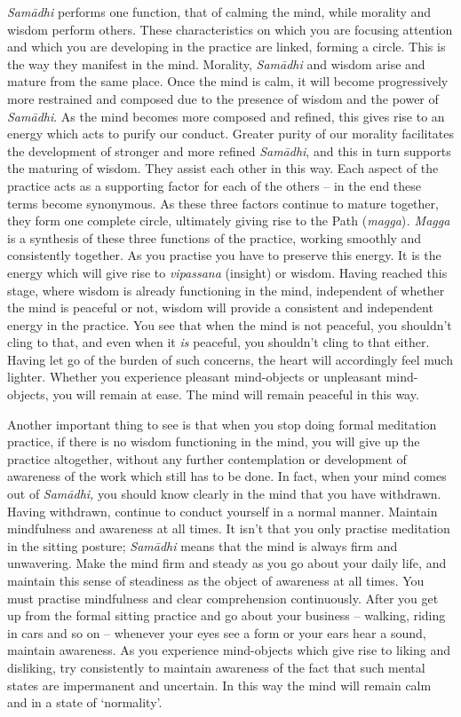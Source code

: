 \textit{Sam\=adhi} performs one function, that of calming the mind, while morality and wisdom perform others. These characteristics on which you are focusing attention and which you are developing in the practice are linked, forming a circle. This is the way they manifest in the mind. Morality, \textit{Sam\=adhi} and wisdom arise and mature from the same place. Once the mind is calm, it will become progressively more restrained and composed due to the presence of wisdom and the power of \textit{Sam\=adhi}. As the mind becomes more composed and refined, this gives rise to an energy which acts to purify our conduct. Greater purity of our morality facilitates the development of stronger and more refined \textit{Sam\=adhi}, and this in turn supports the maturing of wisdom. They assist each other in this way. Each aspect of the practice acts as a supporting factor for each of the others -- in the end these terms become synonymous. As these three factors continue to mature together, they form one complete circle, ultimately giving rise to the Path (\textit{magga})\textit{. Magga} is a synthesis of these three functions of the practice, working smoothly and consistently together. As you practise you have to preserve this energy. It is the energy which will give rise to \textit{vipassana} (insight) or wisdom. Having reached this stage, where wisdom is already functioning in the mind, independent of whether the mind is peaceful or not, wisdom will provide a consistent and independent energy in the practice. You see that when the mind is not peaceful, you shouldn't cling to that, and even when it \textit{is} peaceful, you shouldn't cling to that either. Having let go of the burden of such concerns, the heart will accordingly feel much lighter. Whether you experience pleasant mind-objects or unpleasant mind-objects, you will remain at ease. The mind will remain peaceful in this way.

Another important thing to see is that when you stop doing formal meditation practice, if there is no wisdom functioning in the mind, you will give up the practice altogether, without any further contemplation or development of awareness of the work which still has to be done. In fact, when your mind comes out of \textit{Sam\=adhi,} you should know clearly in the mind that you have withdrawn. Having withdrawn, continue to conduct yourself in a normal manner. Maintain mindfulness and awareness at all times. It isn't that you only practise meditation in the sitting posture; \textit{Sam\=adhi} means that the mind is always firm and unwavering. Make the mind firm and steady as you go about your daily life, and maintain this sense of steadiness as the object of awareness at all times. You must practise mindfulness and clear comprehension continuously. After you get up from the formal sitting practice and go about your business -- walking, riding in cars and so on -- whenever your eyes see a form or your ears hear a sound, maintain awareness. As you experience mind-objects which give rise to liking and disliking, try consistently to maintain awareness of the fact that such mental states are impermanent and uncertain. In this way the mind will remain calm and in a state of `normality'.

